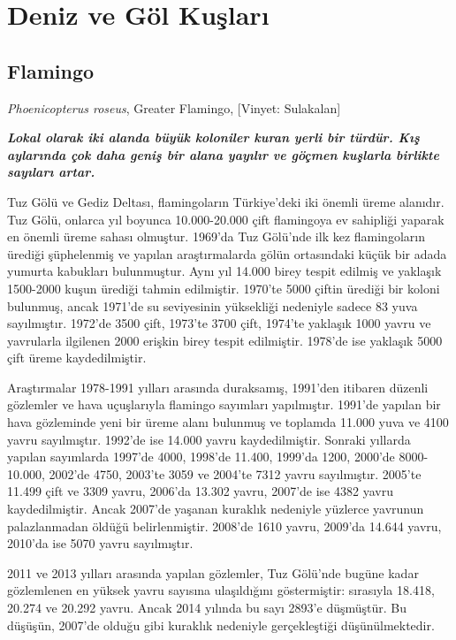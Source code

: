 \documentclass[
  a4paper,
  DIV=11,
  numbers=noendperiod]{scrreprt}
\begin{document}
\chapter{Deniz ve Göl Kuşları}\label{deniz-ve-guxf6l-kuux15flarux131}

\section{Flamingo}\label{flamingo}

\emph{Phoenicopterus roseus}, Greater Flamingo, {[}Vinyet: Sulakalan{]}

\textbf{\emph{Lokal olarak iki alanda büyük koloniler kuran yerli bir
türdür. Kış aylarında çok daha geniş bir alana yayılır ve göçmen
kuşlarla birlikte sayıları artar.}}

Tuz Gölü ve Gediz Deltası, flamingoların Türkiye'deki iki önemli üreme
alanıdır. Tuz Gölü, onlarca yıl boyunca 10.000-20.000 çift flamingoya ev
sahipliği yaparak en önemli üreme sahası olmuştur. 1969'da Tuz Gölü'nde
ilk kez flamingoların ürediği şüphelenmiş ve yapılan araştırmalarda
gölün ortasındaki küçük bir adada yumurta kabukları bulunmuştur. Aynı
yıl 14.000 birey tespit edilmiş ve yaklaşık 1500-2000 kuşun ürediği
tahmin edilmiştir. 1970'te 5000 çiftin ürediği bir koloni bulunmuş,
ancak 1971'de su seviyesinin yüksekliği nedeniyle sadece 83 yuva
sayılmıştır. 1972'de 3500 çift, 1973'te 3700 çift, 1974'te yaklaşık 1000
yavru ve yavrularla ilgilenen 2000 erişkin birey tespit edilmiştir.
1978'de ise yaklaşık 5000 çift üreme kaydedilmiştir.

Araştırmalar 1978-1991 yılları arasında duraksamış, 1991'den itibaren
düzenli gözlemler ve hava uçuşlarıyla flamingo sayımları yapılmıştır.
1991'de yapılan bir hava gözleminde yeni bir üreme alanı bulunmuş ve
toplamda 11.000 yuva ve 4100 yavru sayılmıştır. 1992'de ise 14.000 yavru
kaydedilmiştir. Sonraki yıllarda yapılan sayımlarda 1997'de 4000,
1998'de 11.400, 1999'da 1200, 2000'de 8000-10.000, 2002'de 4750, 2003'te
3059 ve 2004'te 7312 yavru sayılmıştır. 2005'te 11.499 çift ve 3309
yavru, 2006'da 13.302 yavru, 2007'de ise 4382 yavru kaydedilmiştir.
Ancak 2007'de yaşanan kuraklık nedeniyle yüzlerce yavrunun palazlanmadan
öldüğü belirlenmiştir. 2008'de 1610 yavru, 2009'da 14.644 yavru, 2010'da
ise 5070 yavru sayılmıştır.

2011 ve 2013 yılları arasında yapılan gözlemler, Tuz Gölü'nde bugüne
kadar gözlemlenen en yüksek yavru sayısına ulaşıldığını göstermiştir:
sırasıyla 18.418, 20.274 ve 20.292 yavru. Ancak 2014 yılında bu sayı
2893'e düşmüştür. Bu düşüşün, 2007'de olduğu gibi kuraklık nedeniyle
gerçekleştiği düşünülmektedir.
\end{document}
